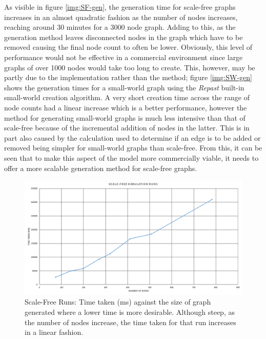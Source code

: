 \documentclass[]{report}
\begin{document}
As visible in figure \ref{img:SF-gen}, the generation time for scale-free graphs increases in an almost quadratic fashion as the number of nodes increases, reaching around 30 minutes for a 3000 node graph. Adding to this, as the generation method leaves disconnected nodes in the graph which have to be removed causing the final node count to often be lower. Obviously, this level of performance would not be effective in a commercial environment since large graphs of over 1000 nodes would take too long to create. This, however, may be partly due to the implementation rather than the method; figure \ref{img:SW-gen} shows the generation times for a small-world graph using the \emph{Repast} built-in small-world creation algorithm. A very short creation time across the range of node counts had a linear increase which is a better performance, however the method for generating small-world graphs is much less intensive than that of scale-free because of the incremental addition of nodes in the latter. This is in part also caused by the calculation used to determine if an edge is to be added or removed being simpler for small-world graphs than scale-free. From this, it can be seen that to make this aspect of the model more commercially viable, it needs to offer a more scalable generation method for scale-free graphs.

\begin{figure}
\begin{center}
\includegraphics[width=\textwidth]{scale-free-runs.png}
\end{center}
\caption{Scale-Free Runs: Time taken (ms) against the size of graph generated where a lower time is more desirable. Although steep, as the number of nodes increase, the time taken for that run increases in a linear fashion.}
\label{img:SF-run}
\end{figure}
\end{document}

